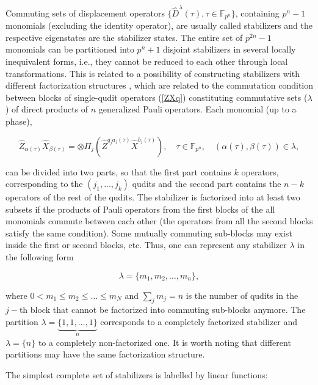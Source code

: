 \documentclass[quantumrep,article,submit,pdftex,moreauthors]{Definitions/mdpi}
\begin{document}
Commuting sets of displacement operators $\{\hat{D}^{\lambda }(\tau), \tau \in
\mathbb{F}_{p^{n}}\}$, containing $p^{n}-1$ monomials (excluding the identity
operator), are usually called stabilizers and the respective eigenstates are the
stabilizer states. The entire set of $p^{2n}-1$ monomials can be partitioned
into $p^{n}+1$ disjoint stabilizers in several locally inequivalent forms, i.e.,
they cannot be reduced to each other through local transformations. This is
related to a possibility of constructing stabilizers with different
factorization structures \cite{factor1,factor2}, which are related to the
commutation condition between blocks of single-qudit operators (\ref{ZXq})
constituting commutative sets ($\lambda$) of direct products of $n$
generalized Pauli operators. Each monomial (up to a phase),

\begin{equation*}
  \hat{Z}_{\alpha(\tau)}\hat{X}_{\beta(\tau)}
  = \otimes \Pi_{j} \left(
    \hat{Z}^{q_{j}a_{j}(\tau)}\hat{X}^{b_{j}(\tau)}
  \right),
  \quad \tau \in \mathbb{F}_{p^{n}},
  \quad \left(\alpha(\tau),\beta(\tau)\right) \in \lambda,
\end{equation*}

can be divided into two parts, so that the first part contains $k$ operators,
corresponding to the $(j_{1},\ldots,j_{k})$ qudits and the second part contains
the $n-k$ operators of the rest of the qudits. The stabilizer is factorized into
at least two subsets if the products of Pauli operators from the first blocks of
the all monomials commute between each other (the operators from all the second
blocks satisfy the same condition).  Some mutually commuting sub-blocks may
exist inside the first or second blocks, etc. Thus, one can represent any
stabilizer $\lambda$ in the following form

\begin{equation}
  \lambda = \{m_{1},m_{2},\ldots,m_{n}\},
  \label{curve_part}
\end{equation}

where $0<m_{1}\leq m_{2} \leq \ldots \leq m_{N}$ and $\sum_{j}m_{j}=n$ is the
number of qudits in the $j-$th block that cannot be factorized into commuting
sub-blocks anymore. The partition $\lambda =\underbrace{\{1,1,\ldots ,1\}}_{n}$
corresponds to a completely factorized stabilizer and $\lambda=\{n\}$ to a
completely non-factorized one. It is worth noting that different partitions may
have the same factorization structure.

The simplest complete set of stabilizers is labelled by linear functions:
\end{document}
